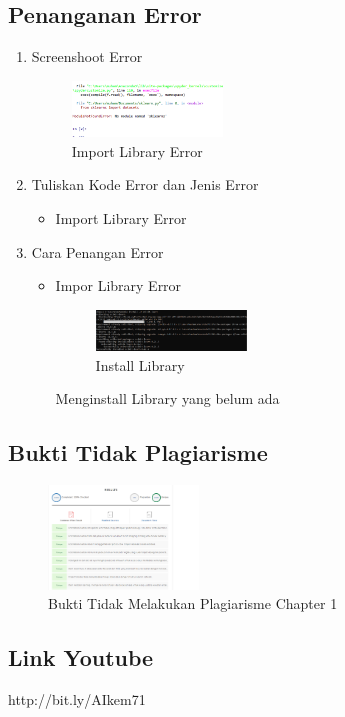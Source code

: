 \subsection{Penanganan Error}
\begin{enumerate}
	\item Screenshoot Error
	\begin{figure}
		\includegraphics[width=4cm]{figures/1174071/1/error/1.PNG}
		\centering
		\caption{Import Library Error}
	\end{figure}

	\item Tuliskan Kode Error dan Jenis Error
	\begin{itemize}
		\item Import Library Error
	\end{itemize}
	\item Cara Penangan Error
	\begin{itemize}
		\item Impor Library Error
		\hfill\break
		\begin{figure}
		\includegraphics[width=4cm]{figures/1174071/1/error/2.PNG}
		\centering
		\caption{Install Library}
		\end{figure}
		Menginstall Library yang belum ada
	\end{itemize}
\end{enumerate}

\subsection{Bukti Tidak Plagiarisme}
\begin{figure}
	\includegraphics[width=4cm]{figures/1174071/1/plagiat/plagiat.PNG}
	\centering
	\caption{Bukti Tidak Melakukan Plagiarisme Chapter 1}
\end{figure}

\subsection{Link Youtube}
http://bit.ly/AIkem71